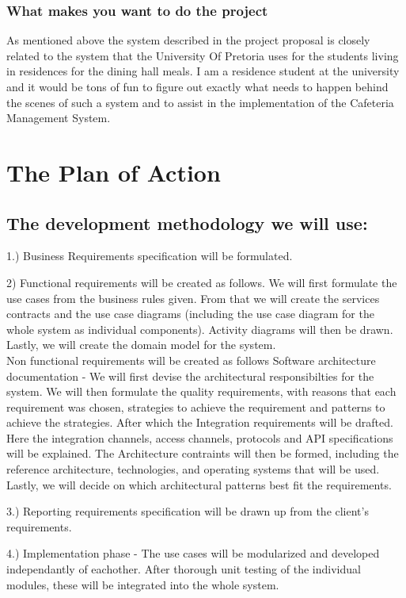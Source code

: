 \documentclass[hidelinks, 12pt, oneside]{article}
\begin{document}
\subsubsection{What makes you want to do the project}
As  mentioned above the system described in the project proposal is closely related to the system that the University Of Pretoria uses for the students living in residences for the dining hall meals. I am a residence student at the university and it would be tons of fun to figure out exactly what needs to happen behind the scenes of such a system and to assist in the implementation of the Cafeteria Management System. 

\section{The Plan of Action}

\subsection{The development methodology we will use:}

1.) Business Requirements specification will be formulated.

2) Functional requirements will be created as follows. We will first formulate the use cases from the business rules given. From that we will create the services contracts and the use case diagrams (including the use case diagram for the whole system as individual components). Activity diagrams will then be drawn. Lastly, we will create the domain model for the system.
\\
Non functional requirements will be created as follows
Software architecture documentation - We will first devise the architectural responsibilties for the system. We will then formulate the quality requirements, with reasons that each requirement was chosen, strategies to achieve the requirement and patterns to achieve the strategies. After which the Integration requirements will be drafted. Here the integration channels, access channels, protocols and API specifications will be explained. The Architecture contraints will then be formed, including the reference architecture, technologies, and operating systems that will be used. Lastly, we will decide on which architectural patterns best fit the requirements. 

3.) Reporting requirements specification will be drawn up from the client's requirements. 

4.) Implementation phase - The use cases will be modularized and developed independantly of eachother. After thorough unit testing of the individual modules, these will be integrated into the whole system. 
\end{document}
